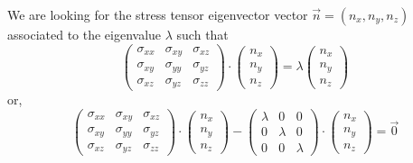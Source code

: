We are looking for the stress tensor eigenvector vector $\vec{n}=(n_x,n_y,n_z)$ associated to the
eigenvalue $\lambda$ such that 
\[
\left(\begin{array}{ccc}
\sigma_{xx} & \sigma_{xy} & \sigma_{xz} \\
\sigma_{xy} & \sigma_{yy} & \sigma_{yz} \\
\sigma_{xz} & \sigma_{yz} & \sigma_{zz}
\end{array}\right)
\cdot
\left(\begin{array}{c}
n_x \\ n_y \\ n_z
\end{array}\right)
=
\lambda
\left(\begin{array}{c}
n_x \\ n_y \\ n_z
\end{array}\right)
\]
or,
\[
\left(\begin{array}{ccc}
\sigma_{xx} & \sigma_{xy} & \sigma_{xz} \\
\sigma_{xy} & \sigma_{yy} & \sigma_{yz} \\
\sigma_{xz} & \sigma_{yz} & \sigma_{zz}
\end{array}\right)
\cdot
\left(\begin{array}{c}
n_x \\ n_y \\ n_z
\end{array}\right)
-
\left(\begin{array}{ccc}
\lambda & 0 & 0\\ 
0 & \lambda  & 0 \\
0 & 0 & \lambda 
\end{array}\right)
\cdot
\left(\begin{array}{c}
n_x \\ n_y \\ n_z
\end{array}\right)
= \vec{0}
\]

